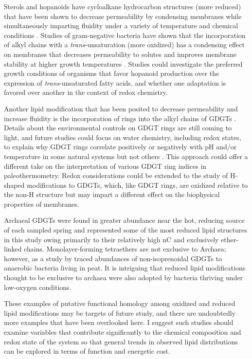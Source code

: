 Sterols and hopanoids have cycloalkane hydrocarbon structures (more reduced) that have been shown to decrease permeability by condensing membranes while simultaneously imparting fluidity under a variety of temperature and chemical conditions \citep{belin2018hopanoid}. Studies of gram-negative bacteria have shown that the incorporation of alkyl chains with a \textit{trans}-unsaturation (more oxidized) has a condensing effect on membranes that decreases permeability to solutes \citep{halverson2000differential} and improves membrane stability at higher growth temperatures \citep{heipieper1996effect}. Studies could investigate the preferred growth conditions of organisms that favor hopanoid production over the expression of \textit{trans}-unsaturated fatty acids, and whether one adaptation is favored over another in the context of redox chemistry.

Another lipid modification that has been posited to decrease permeability and increase fluidity is the incorporation of rings into the alkyl chains of GDGTs \citep{sollich2017heat}. Details about the environmental controls on GDGT rings are still coming to light, and future studies could focus on water chemistry, including redox states, to explain why GDGT rings correlate positively or negatively with pH and/or temperature in some natural systems but not others \citep{jia2014differential, boyd2013role}. This approach could offer a different take on the interpretation of various GDGT ring indices in paleothermometry. Redox considerations could be extended to the study of H-shaped modifications to GDGTs, which, like GDGT rings, are oxidized relative to the non-H structure but may impart a different effect on the biophysical properties of membranes.

Archaeal GDGTs were found in greater abundance near the hot, reducing source of each sampled spring and represented some of the most reduced lipid structures in this study owing primarily to their relatively high nC and exclusively ether-linked chains. Monolayer-forming tetraethers are not exclusive to Archaea; however, as a study by \cite{} traced abundances of non-isoprenoidal GDGTs to anaerobic bacteria living in peat. It is intriguing that reduced lipid modifications thought to be exclusive to archaea were also adopted by bacteria thriving under low-oxygen conditions.

These examples of putative functional homology among oxidized and reduced lipid modifications may be targets of future study, and there are undoubtedly more examples that have been overlooked here. I suggest such studies should examine variables that contribute significantly to the chemical composition and redox state of the system so that general trends in observed lipid distributions can be explored in terms of function and energetic cost.





